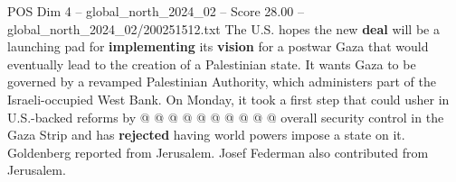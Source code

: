\begin{textsample}{POS Dim 4 – global\_north\_2024\_02 – Score 28.00 – global\_north\_2024\_02/200251512.txt}
The U.S. hopes the new \textbf{deal} will be a launching pad for \textbf{implementing} its \textbf{vision} for a postwar Gaza that would eventually lead to the creation of a Palestinian state.
It wants Gaza to be governed by a revamped Palestinian Authority, which administers part of the Israeli-occupied West Bank.
On Monday, it took a first step that could usher in U.S.-backed reforms by @ @ @ @ @ @ @ @ @ @ overall security control in the Gaza Strip and has \textbf{rejected} having world powers impose a state on it.
Goldenberg reported from Jerusalem.
Josef Federman also contributed from Jerusalem.

\end{textsample}
